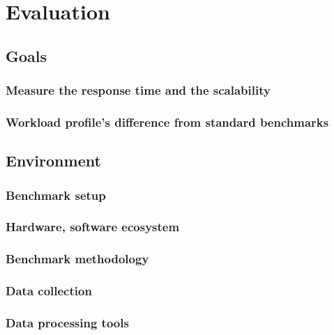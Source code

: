 \chapter{Evaluation}
\label{chap:evaluation}

\section{Goals}


\subsection{Measure the response time and the scalability}

\subsection{Workload profile's difference from standard benchmarks}

\section{Environment}

\subsection{Benchmark setup}


\subsection{Hardware, software ecosystem}

\subsection{Benchmark methodology}

\subsection{Data collection}

\subsection{Data processing tools}


